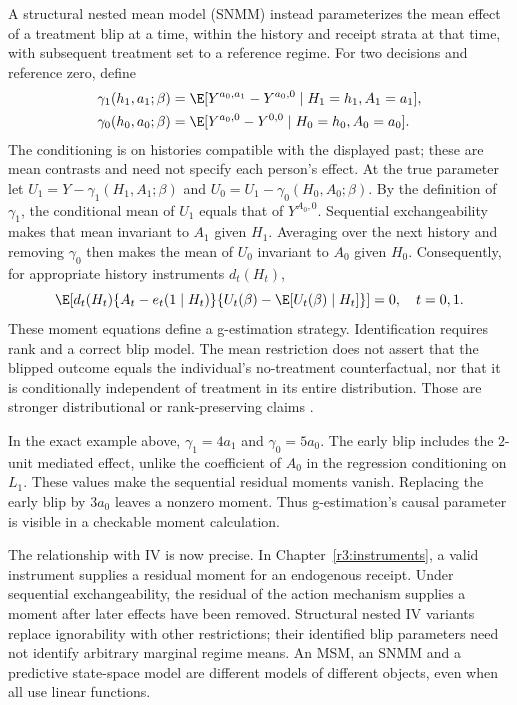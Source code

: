 A structural nested mean model (SNMM) instead parameterizes the mean
effect of a treatment blip at a time, within the history and receipt
strata at that time, with subsequent treatment set to a reference regime.
For two decisions and reference zero, define
\begin{align}
 \gamma_1(h_1,a_1;\beta)
 &=\E[Y^{a_0,a_1}-Y^{a_0,0}\mid H_1=h_1,A_1=a_1],\nonumber\\
 \gamma_0(h_0,a_0;\beta)
 &=\E[Y^{a_0,0}-Y^{0,0}\mid H_0=h_0,A_0=a_0].
 \label{r3:blips}
\end{align}
The conditioning is on histories compatible with the displayed past;
these are mean contrasts and need not specify each person's effect.
At the true parameter let
$U_1=Y-\gamma_1(H_1,A_1;\beta)$ and
$U_0=U_1-\gamma_0(H_0,A_0;\beta)$.
By the definition of $\gamma_1$, the conditional mean of $U_1$ equals
that of $Y^{A_0,0}$. Sequential exchangeability makes that mean invariant
to $A_1$ given $H_1$. Averaging over the next history and removing
$\gamma_0$ then makes the mean of $U_0$ invariant to $A_0$ given $H_0$.
Consequently, for appropriate history instruments $d_t(H_t)$,
\begin{equation}
 \E\!\left[d_t(H_t)\{A_t-e_t(1\mid H_t)\}
           \{U_t(\beta)-\E[U_t(\beta)\mid H_t]\}\right]=0,
 \quad t=0,1.
 \label{r3:g-estimation}
\end{equation}
These moment equations define a g-estimation strategy. Identification
requires rank and a correct blip model. The mean restriction does not
assert that the blipped outcome equals the individual's no-treatment
counterfactual, nor that it is conditionally independent of treatment
in its entire distribution. Those are stronger distributional or
rank-preserving claims \citep[Sections 3.2, 5 and 6.1]{snm2014}.

In the exact example above, $\gamma_1=4a_1$ and $\gamma_0=5a_0$.
The early blip includes the $2$-unit mediated effect, unlike the
coefficient of $A_0$ in the regression conditioning on $L_1$.
These values make the sequential residual moments vanish. Replacing
the early blip by $3a_0$ leaves a nonzero moment. Thus g-estimation's
causal parameter is visible in a checkable moment calculation.

The relationship with IV is now precise. In Chapter~\ref{r3:instruments},
a valid instrument supplies a residual moment for an endogenous receipt.
Under sequential exchangeability, the residual of the action mechanism
supplies a moment after later effects have been removed. Structural
nested IV variants replace ignorability with other restrictions; their
identified blip parameters need not identify arbitrary marginal regime
means. An MSM, an SNMM and a predictive state-space model are different
models of different objects, even when all use linear functions.

